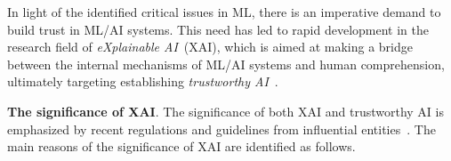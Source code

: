 In light of the identified critical issues in ML, there is an imperative demand
to build trust in ML/AI systems.
%
This need has led to rapid development in the research field of \emph{eXplainable AI}~(XAI),
which is aimed at making a bridge between the internal mechanisms of ML/AI systems and human comprehension, 
ultimately targeting establishing \emph{trustworthy AI}~\cite{ms-rw22}.



\textbf{The significance of XAI}.
%
The significance of both XAI and trustworthy AI is emphasized by 
recent regulations and guidelines from influential entities~\cite{darpa-xai16,hlegai19,hlegai20,eucoord21,euaiact21,oecd21,unesco21,ms-rw22}.
%
The main reasons of the significance of XAI are identified 
as follows.

